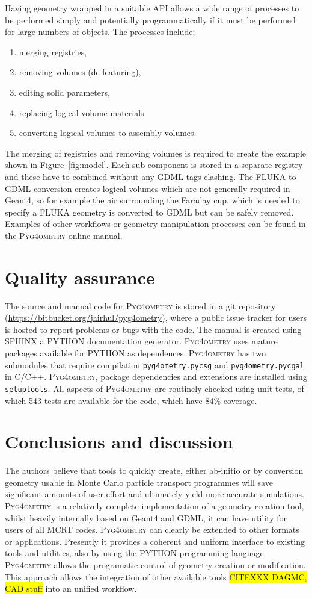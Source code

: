 \documentclass[final,5p,times,twocolumn]{elsarticle}
\newcommand{\pyinline}[1]{\lstinline[postbreak={}]{#1}}
\newcommand{\PYGEOMETRY}{\textsc{Pyg4ometry}}
\begin{document}
Having geometry wrapped in a suitable API allows a wide range of processes to be performed simply and potentially 
programmatically if it must be performed for large numbers of objects. The processes include; 
\begin{enumerate}
\item merging registries, 
\item removing volumes (de-featuring),
\item editing solid parameters,
\item replacing logical volume materials 
\item converting logical volumes to assembly volumes.
\end{enumerate}
The merging of registries and removing volumes is required to create the example shown in Figure~\ref{fig:model}. 
Each sub-component is stored in a separate registry and these have to combined without any GDML tags clashing. 
The FLUKA to GDML conversion creates logical volumes which are not generally required in Geant4, so for example
the air surrounding the Faraday cup, which is needed to specify a FLUKA geometry is converted to GDML but can be 
safely removed. Examples of other workflows or geometry manipulation processes can be found in 
the \PYGEOMETRY{} online manual.

\section{Quality assurance}
The source and manual code for \PYGEOMETRY{} is stored in a git repository (\url{https://bitbucket.org/jairhul/pyg4ometry}), 
where a public issue tracker for users is hosted to report problems or bugs with the code. The manual is created using SPHINX a 
PYTHON documentation generator. \PYGEOMETRY{} uses mature packages available for PYTHON as dependences. 
\PYGEOMETRY{} has  two submodules that require compilation \pyinline{pyg4ometry.pycsg} and \pyinline{pyg4ometry.pycgal} 
in C/C++. \PYGEOMETRY{}, package dependencies and extensions are installed using \pyinline{setuptools}. All aspects of 
\PYGEOMETRY{} are routinely checked using unit tests, of which 543 tests are available for the code, which have 84\% coverage. 

\section{Conclusions and discussion}
The authors believe that tools to quickly create, either ab-initio or by conversion geometry usable in Monte Carlo
particle transport programmes will save significant amounts of user effort and ultimately 
yield more accurate simulations. \PYGEOMETRY{} is a relatively complete implementation of a geometry 
creation tool, whilst heavily internally based on Geant4 and GDML, it can have utility for users of all MCRT 
codes. \PYGEOMETRY{} can clearly be extended to other formats or applications. Presently it provides a coherent and 
uniform interface to existing tools and utilities, also by using the PYTHON programming language \PYGEOMETRY{} 
allows the programatic control of geometry creation or modification. This approach allows the integration of 
other available tools \colorbox{yellow}{CITEXXX DAGMC, CAD stuff} into an unified workflow.
\end{document}
